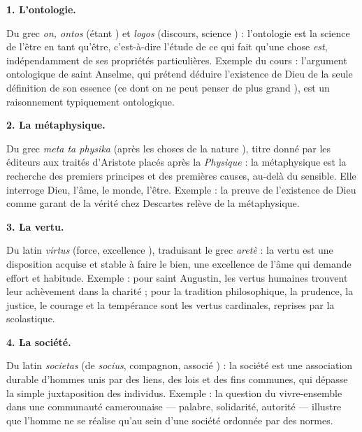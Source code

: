 \documentclass[11pt]{article}
\begin{document}
\begin{corrige}

\textbf{1. L'ontologie.}\par Du grec \emph{on, ontos} (\guillemotleft étant \guillemotright) et \emph{logos} (\guillemotleft discours, science \guillemotright) : l'ontologie est la science de l'être en tant qu'être, c'est-à-dire l'étude de ce qui fait qu'une chose \emph{est}, indépendamment de ses propriétés particulières. Exemple du cours : l'argument ontologique de saint Anselme, qui prétend déduire l'existence de Dieu de la seule définition de son essence (\guillemotleft ce dont on ne peut penser de plus grand \guillemotright), est un raisonnement typiquement ontologique.

\textbf{2. La métaphysique.}\par Du grec \emph{meta ta physika} (\guillemotleft après les choses de la nature \guillemotright), titre donné par les éditeurs aux traités d'Aristote placés après la \emph{Physique} : la métaphysique est la recherche des premiers principes et des premières causes, au-delà du sensible. Elle interroge Dieu, l'âme, le monde, l'être. Exemple : la preuve de l'existence de Dieu comme garant de la vérité chez Descartes relève de la métaphysique.

\textbf{3. La vertu.}\par Du latin \emph{virtus} (\guillemotleft force, excellence \guillemotright), traduisant le grec \emph{aretè} : la vertu est une disposition acquise et stable à faire le bien, une excellence de l'âme qui demande effort et habitude. Exemple : pour saint Augustin, les vertus humaines trouvent leur achèvement dans la charité ; pour la tradition philosophique, la prudence, la justice, le courage et la tempérance sont les vertus cardinales, reprises par la scolastique.

\textbf{4. La société.}\par Du latin \emph{societas} (de \emph{socius}, \guillemotleft compagnon, associé \guillemotright) : la société est une association durable d'hommes unis par des liens, des lois et des fins communes, qui dépasse la simple juxtaposition des individus. Exemple : la question du vivre-ensemble dans une communauté camerounaise — palabre, solidarité, autorité — illustre que l'homme ne se réalise qu'au sein d'une société ordonnée par des normes.

\end{corrige}
\end{document}
